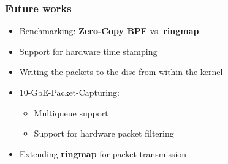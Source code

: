 \begin{frame}
\frametitle{Future works}
\begin{itemize}
	\item Benchmarking:  \textbf{Zero-Copy BPF} vs. \textbf{ringmap}
	\item Support for hardware time stamping
	\item Writing the packets to the disc from within the kernel
	\item 10-GbE-Packet-Capturing: 
		\begin{itemize}
			\item Multiqueue support 
			\item Support for hardware packet filtering
		\end{itemize}
	\item Extending \textbf{ringmap} for packet transmission 
\end{itemize}
\end{frame}
